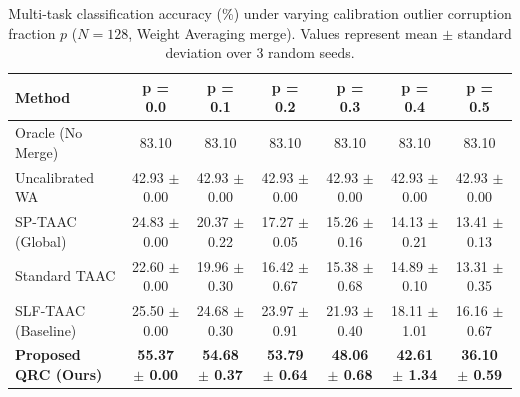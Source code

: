 \documentclass{article}
\theoremstyle{plain}
\theoremstyle{definition}
\theoremstyle{remark}
\begin{document}
\begin{table}[t]
  \caption{Multi-task classification accuracy (\%) under varying calibration outlier corruption fraction $p$ ($N=128$, Weight Averaging merge). Values represent mean $\pm$ standard deviation over 3 random seeds.}
  \label{tab:sweep1}
  \vskip 0.15in
  \begin{center}
    \begin{small}
      \begin{tabular}{lcccccc}
        \toprule
        \textbf{Method} & \textbf{p = 0.0} & \textbf{p = 0.1} & \textbf{p = 0.2} & \textbf{p = 0.3} & \textbf{p = 0.4} & \textbf{p = 0.5} \\
        \midrule
        Oracle (No Merge) & 83.10 & 83.10 & 83.10 & 83.10 & 83.10 & 83.10 \\
        Uncalibrated WA & 42.93 $\pm$ 0.00 & 42.93 $\pm$ 0.00 & 42.93 $\pm$ 0.00 & 42.93 $\pm$ 0.00 & 42.93 $\pm$ 0.00 & 42.93 $\pm$ 0.00 \\
        SP-TAAC (Global) & 24.83 $\pm$ 0.00 & 20.37 $\pm$ 0.22 & 17.27 $\pm$ 0.05 & 15.26 $\pm$ 0.16 & 14.13 $\pm$ 0.21 & 13.41 $\pm$ 0.13 \\
        Standard TAAC & 22.60 $\pm$ 0.00 & 19.96 $\pm$ 0.30 & 16.42 $\pm$ 0.67 & 15.38 $\pm$ 0.68 & 14.89 $\pm$ 0.10 & 13.31 $\pm$ 0.35 \\
        SLF-TAAC (Baseline) & 25.50 $\pm$ 0.00 & 24.68 $\pm$ 0.30 & 23.97 $\pm$ 0.91 & 21.93 $\pm$ 0.40 & 18.11 $\pm$ 1.01 & 16.16 $\pm$ 0.67 \\
        \textbf{Proposed QRC (Ours)} & \textbf{55.37 $\pm$ 0.00} & \textbf{54.68 $\pm$ 0.37} & \textbf{53.79 $\pm$ 0.64} & \textbf{48.06 $\pm$ 0.68} & \textbf{42.61 $\pm$ 1.34} & \textbf{36.10 $\pm$ 0.59} \\
        \bottomrule
      \end{tabular}
    \end{small}
  \end{center}
  \vskip -0.1in
\end{table}
\end{document}
